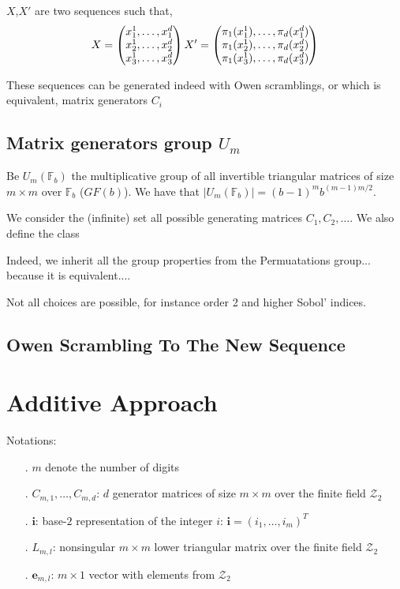 \documentclass[]{elsarticle}
\theoremstyle{definition}
\newcommand{\bvec}[1]{\boldsymbol{#1}}
\newcommand{\vi}{\bvec{i}}
\newcommand{\ve}{\bvec{e}}
\def\abs#1{\ensuremath{\left \lvert #1 \right \rvert}}
\begin{document}
$X$,$X'$ are two sequences such that,
\[
X = \begin{pmatrix}
x_1^1,\dots,x_1^d \\
x_2^1,\dots,x_2^d \\
x_3^1,\dots,x_3^d \\
\end{pmatrix} \\
X' = \begin{pmatrix}
\pi_1(x_1^1),\dots,\pi_d(x_1^d) \\
\pi_1(x_2^1),\dots,\pi_d(x_2^d) \\
\pi_1(x_3^1),\dots,\pi_d(x_3^d) \\
\end{pmatrix}
\]

These sequences can be generated indeed with Owen scramblings, or which is equivalent, matrix generators $C_i$

\subsection{Matrix generators group $U_m$}

Be $U_m(\mathbb{F}_b)$ the multiplicative group of all invertible triangular matrices of size $m\times m$ over $\mathbb{F}_b$ ($GF(b)$). We have that $\abs{U_m(\mathbb{F}_b)}=(b-1)^m b^{(m-1)m/2}$.

We consider the (infinite) set all possible generating matrices $C_1,C_2,\dots$. We also define the class 

Indeed, we inherit all the group properties from the Permuatations group... because it is equivalent....

Not all choices are possible, for instance order 2 and higher Sobol' indices.

\subsection{Owen Scrambling To The New Sequence}


\section{Additive Approach}
Notations:
\begin{itemize}
\item[.] $m$ denote the number of digits
\item[.] $C_{m,1},\dots,C_{m,d}$: $d$ generator matrices of size $m \times m$ over the finite field $\mathcal{Z}_2$
\item[.] $\vi$: base-$2$ representation of the integer $i$: $\vi=(i_1,\dots,i_m)^T$
\item[.] $L_{m,l}$: nonsingular $m \times m$ lower triangular matrix over the finite field $\mathcal{Z}_2$
\item[.] $\ve_{m,l}$: $m \times 1$ vector with elements from $\mathcal{Z}_2$
\end{itemize}
\end{document}
